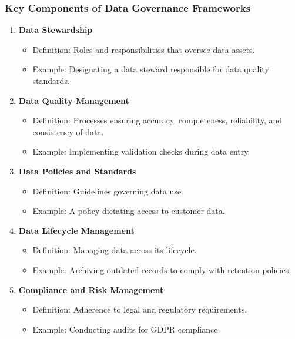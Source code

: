 \documentclass[aspectratio=169]{beamer}
\begin{document}
\begin{frame}[fragile]
    \frametitle{Key Components of Data Governance Frameworks}
    \begin{enumerate}
        \item \textbf{Data Stewardship}
            \begin{itemize}
                \item Definition: Roles and responsibilities that oversee data assets.
                \item Example: Designating a data steward responsible for data quality standards.
            \end{itemize}
        \item \textbf{Data Quality Management}
            \begin{itemize}
                \item Definition: Processes ensuring accuracy, completeness, reliability, and consistency of data.
                \item Example: Implementing validation checks during data entry.
            \end{itemize}
        \item \textbf{Data Policies and Standards}
            \begin{itemize}
                \item Definition: Guidelines governing data use.
                \item Example: A policy dictating access to customer data.
            \end{itemize}
        \item \textbf{Data Lifecycle Management}
            \begin{itemize}
                \item Definition: Managing data across its lifecycle.
                \item Example: Archiving outdated records to comply with retention policies.
            \end{itemize}
        \item \textbf{Compliance and Risk Management}
            \begin{itemize}
                \item Definition: Adherence to legal and regulatory requirements.
                \item Example: Conducting audits for GDPR compliance.
            \end{itemize}
    \end{enumerate}
\end{frame}
\end{document}
